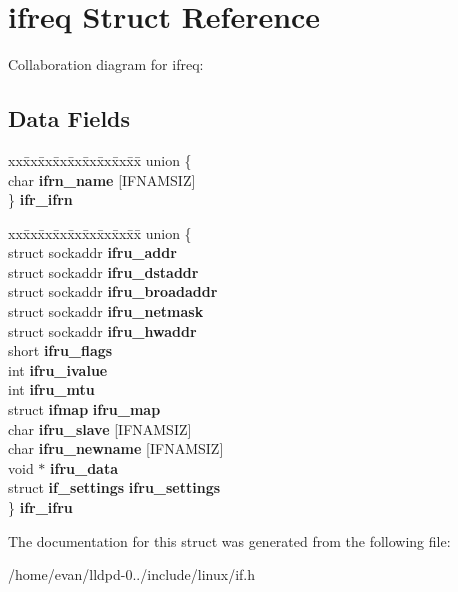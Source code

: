 \section{ifreq \-Struct \-Reference}
\label{structifreq}


\-Collaboration diagram for ifreq\-:
\subsection*{\-Data \-Fields}
\begin{DoxyCompactItemize}
\item 
\begin{tabbing}
xx\=xx\=xx\=xx\=xx\=xx\=xx\=xx\=xx\=\kill
union \{\\
\>char {\bfseries ifrn\_name} [IFNAMSIZ]\\
\} {\bfseries ifr\_ifrn}\label{structifreq_a4cc61c82a227096fe342afa17294ffe3}
\\

\end{tabbing}\item 
\begin{tabbing}
xx\=xx\=xx\=xx\=xx\=xx\=xx\=xx\=xx\=\kill
union \{\\
\>struct sockaddr {\bfseries ifru\_addr}\\
\>struct sockaddr {\bfseries ifru\_dstaddr}\\
\>struct sockaddr {\bfseries ifru\_broadaddr}\\
\>struct sockaddr {\bfseries ifru\_netmask}\\
\>struct sockaddr {\bfseries ifru\_hwaddr}\\
\>short {\bfseries ifru\_flags}\\
\>int {\bfseries ifru\_ivalue}\\
\>int {\bfseries ifru\_mtu}\\
\>struct {\bf ifmap} {\bfseries ifru\_map}\\
\>char {\bfseries ifru\_slave} [IFNAMSIZ]\\
\>char {\bfseries ifru\_newname} [IFNAMSIZ]\\
\>void $\ast$ {\bfseries ifru\_data}\\
\>struct {\bf if\_settings} {\bfseries ifru\_settings}\\
\} {\bfseries ifr\_ifru}\label{structifreq_a1158df39365886410ab31a65682cfdc4}
\\

\end{tabbing}\end{DoxyCompactItemize}


\-The documentation for this struct was generated from the following file\-:\begin{DoxyCompactItemize}
\item 
/home/evan/lldpd-\/0../include/linux/if.\-h\end{DoxyCompactItemize}
